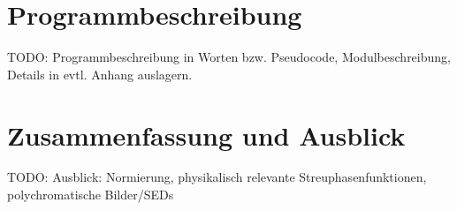 \documentclass[11pt,a4paper,DIVcalc,BCOR8mm,titlepage,twoside]{scrartcl}
\begin{document}
	\section{Programmbeschreibung}
	TODO: Programmbeschreibung in Worten bzw. Pseudocode, Modulbeschreibung, Details in evtl. Anhang auslagern.
	
	\section{Zusammenfassung und Ausblick}
	TODO: Ausblick: Normierung, physikalisch relevante Streuphasenfunktionen, polychromatische Bilder/SEDs

	
	
\end{document}
